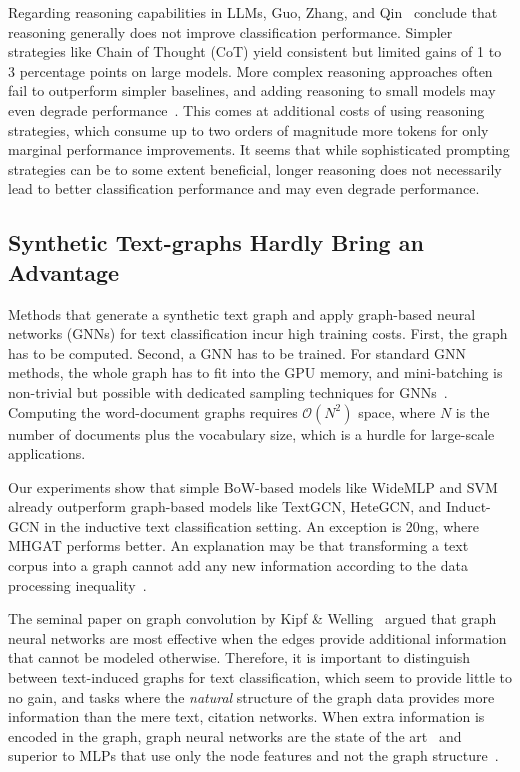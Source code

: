 \documentclass[lettersize,journal]{IEEEtran}
\newcommand{\LLMs}{LLMs\xspace}
\begin{document}
Regarding reasoning capabilities in \LLMs, Guo, Zhang, and Qin~\cite{guo2026textreasoningbenchdoesreasoningreally} conclude that reasoning generally does not improve classification performance. 
Simpler strategies like Chain of Thought (CoT) yield consistent but limited gains of 1 to 3 percentage points on large models. 
More complex reasoning approaches often fail to outperform simpler baselines, and adding reasoning to small models may even degrade performance~\cite{guo2026textreasoningbenchdoesreasoningreally}. 
This comes at additional costs of using reasoning strategies, which consume up to two orders of magnitude more tokens for only marginal performance improvements. 
It seems that while sophisticated prompting strategies can be to some extent beneficial, longer reasoning does not necessarily lead to better classification performance and may even degrade performance. 

\subsection{Synthetic Text-graphs Hardly Bring an Advantage}

Methods that generate a synthetic text graph and apply graph-based neural networks (GNNs) for text classification incur high training costs.
First, the graph has to be computed.
Second, a GNN has to be trained. 
For standard GNN methods, the whole graph has to fit into the GPU memory, and mini-batching is non-trivial but possible with dedicated sampling techniques for GNNs~\cite{DBLP:conf/icml/FeyLWL21}. 
Computing the word-document graphs requires $\mathcal{O}(N^2)$ space, where $N$ is the number of documents plus the vocabulary size, which is a hurdle for large-scale applications.

Our experiments show that simple BoW-based models like WideMLP and SVM already outperform graph-based models like TextGCN, HeteGCN, and Induct-GCN in the inductive text classification setting.
An exception is 20ng, where MHGAT performs better.
An explanation may be that transforming a text corpus into a graph cannot add any new information according to the data processing inequality~\cite{cover_elements_1991}.

The seminal paper on graph convolution by Kipf \& Welling~\cite{DBLP:conf/iclr/KipfW17} argued that graph neural networks are most effective when the edges provide additional information that cannot be modeled otherwise.
Therefore, it is important to distinguish between text-induced graphs for text classification, which seem to provide little to no gain, and tasks where the \emph{natural} structure of the graph data provides more information than the mere text, \eg citation networks. 
When extra information is encoded in the graph, graph neural networks are the state of the art~\cite{DBLP:conf/iclr/KipfW17,velickovic2018graph} and superior to MLPs that use only the node features and not the graph structure~\cite{DBLP:journals/corr/abs-1811-05868}.
\end{document}

